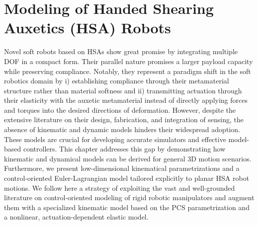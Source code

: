 \chapter{Modeling of Handed Shearing Auxetics (HSA) Robots}
\label{chp:hsamodel}

\begin{foreword}
    Novel soft robots based on \glspl{HSA} show great promise by integrating multiple \gls{DOF} in a compact form. Their parallel nature promises a larger payload capacity while preserving compliance. Notably, they represent a paradigm shift in the soft robotics domain by i) establishing compliance through their metamaterial structure rather than material softness and ii) transmitting actuation through their elasticity with the auxetic metamaterial instead of directly applying forces and torques into the desired directions of deformation.
    However, despite the extensive literature on their design, fabrication, and integration of sensing, the absence of kinematic and dynamic models hinders their widespread adoption. These models are crucial for developing accurate simulators and effective model-based controllers.
    This chapter addresses this gap by demonstrating how kinematic and dynamical models can be derived for general 3D motion scenarios. Furthermore, we present low-dimensional kinematical parametrizations and a control-oriented Euler-Lagrangian model tailored explicitly to planar \gls{HSA} robot motions.
    We follow here a strategy of exploiting the vast and well-grounded literature on control-oriented modeling of rigid robotic manipulators and augment them with a specialized kinematic model based on the \gls{PCS} parametrization and a nonlinear, actuation-dependent elastic model.
\end{foreword}

\pagebreak

\begin{abstract}
    Electrically-actuated continuum soft robots based on \glspl{HSA} promise rapid actuation capabilities while preserving structural compliance. However, the foundational models of these novel actuators required for precise control strategies are missing. This chapter proposes two key components extending the \gls{DCM} to allow for modeling \glspl{HSA}. First, we propose a mechanism for incorporating the auxetic trajectory into \gls{DCM} dynamical simulations. We also propose an implementation of this extension as a plugin for the Elastica simulator. Second, we introduce a \gls{SPCS} kinematic parameterization that can describe an HSA segment's shape with fewer configuration variables. We verify both theoretical contributions experimentally. The simulator is used to replicate experimental data of the mechanical characterization of HSA rods. For the second component, we attach motion capture markers at various points to a parallel HSA robot and find that the shape of the HSAs can be kinematically represented with an average accuracy of \SI{0.3}{mm} for positions and \SI{0.07}{rad} for orientations.
\end{abstract}

